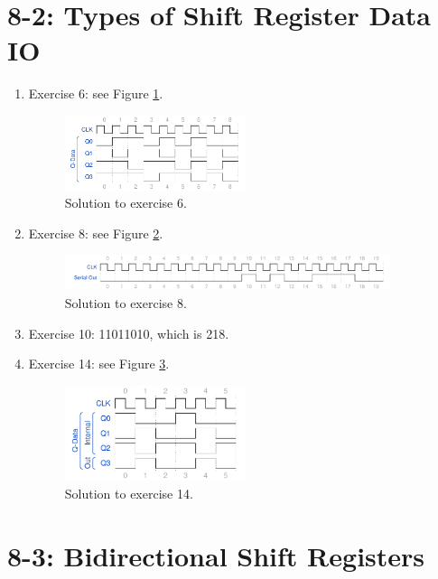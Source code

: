 \documentclass[10pt]{article}
\begin{document}
\maketitle

\section{8-2: Types of Shift Register Data IO}

\begin{enumerate}
\item Exercise 6: see Figure \ref{fig:wave0}.
\begin{figure}[ht]
\centering
\includegraphics[width=0.5\textwidth]{code/hmk6_8-2-6.pdf}
\caption{\label{fig:wave0} Solution to exercise 6.}
\end{figure}
\item Exercise 8: see Figure \ref{fig:wave1}.
\begin{figure}[ht]
\centering
\includegraphics[width=0.9\textwidth]{code/hmk6_8-2-8.pdf}
\caption{\label{fig:wave1} Solution to exercise 8.}
\end{figure}
\item Exercise 10: 11011010, which is 218.
\item Exercise 14: see Figure \ref{fig:wave2a}.
\begin{figure}[ht]
\centering
\includegraphics[width=0.5\textwidth]{code/hmk6_8-2-14.pdf}
\caption{\label{fig:wave2a} Solution to exercise 14.}
\end{figure}
\end{enumerate}

\section{8-3: Bidirectional Shift Registers}
\end{document}
